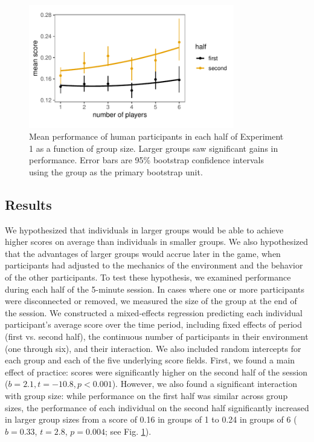 \documentclass[12pt,letterpaper]{article}
\newcommand{\andrew}[1]{\textcolor{magenta}{\bf [Andrew: #1]}}
\begin{document}
\begin{figure}[t!]
  \centering
  \includegraphics[width=0.8\textwidth]{./figures/performance-summary-exp1.pdf}
  \caption{Mean performance of human participants in each half of Experiment 1 as a function of group size. Larger groups saw significant gains in performance. Error bars are 95\% bootstrap confidence intervals using the group as the primary bootstrap unit. %
  }
  \label{fig:exp1_performance}
\end{figure}

\subsection{Results}

We hypothesized that individuals in larger groups would be able to achieve higher scores on average than individuals in smaller groups. 
We also hypothesized that the advantages of larger groups would accrue later in the game, when participants had adjusted to the mechanics of the environment and the behavior of the other participants.
To test these hypothesis, we examined performance during each half of the 5-minute session. 
In cases where one or more participants were disconnected or removed, we measured the size of the group at the end of the session.
We constructed a mixed-effects regression predicting each individual participant's average score over the time period, including fixed effects of period (first vs. second half), the continuous number of participants in their environment (one through six), and their interaction.
We also included random intercepts for each group and each of the five underlying score fields.
First, we found a main effect of practice: scores were significantly higher on the second half of the session ($b = 2.1,t=-10.8, p < 0.001$).
However, we also found a significant interaction with group size: while performance on the first half was similar across group sizes, the performance of each individual on the second half significantly increased in larger group sizes from a score of 0.16 in groups of 1 to 0.24 in groups of 6 ($b = 0.33$, $t = 2.8$, $p = 0.004$; see Fig. \ref{fig:exp1_performance}). 
\end{document}
